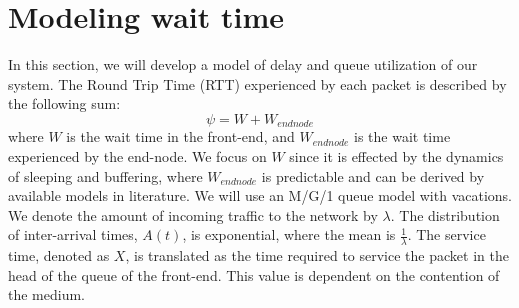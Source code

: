 \section{Modeling wait time}\label{sec:model}

In this section, we will develop a model of delay and queue utilization of our system. The Round Trip Time (RTT) experienced by each packet is described by the following sum:
\begin{equation}
\psi = W + W_{end node}
\end{equation}
where $W$ is the wait time in the front-end, and $W_{end node}$ is the wait time experienced by the end-node. We focus on $W$ since it is effected by the dynamics of sleeping and buffering, where $W_{end node}$ is predictable and can be derived by available models in literature. We will use an M/G/1 queue model with vacations. We denote the amount of incoming traffic to the network by $\lambda$. The distribution of inter-arrival times, $A(t)$, is exponential, where the mean is $\frac{1}{\lambda}$. The service time, denoted as $X$, is translated as the time required to service the packet in the head of the queue of the front-end. This value is dependent on the contention of the medium.

